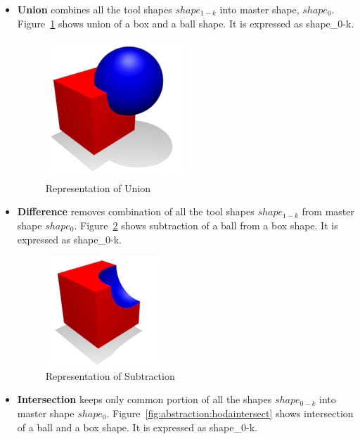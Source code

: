 \begin{itemize}[noitemsep,topsep=2pt,parsep=2pt,partopsep=2pt]
\item {\bf Union} combines all the tool shapes ${shape_{1-k}}$ into master shape, $shape_0$.  Figure~\ref{fig:abstraction:hodaunion} shows union of a box and a ball shape. It is expressed as  {shape_{0-k}}.

\begin{figure}[!h]
\centering 
\includegraphics[width=0.35\linewidth]{../Common/images/wikiunite} 
\caption{Representation of Union}
\label{fig:abstraction:hodaunion}
\end{figure}


\item {\bf Difference} removes combination of all the tool shapes ${shape_{1-k}}$ from master shape $shape_0$. Figure~\ref{fig:abstraction:hodasubtract} shows subtraction of a ball from a box shape. It is expressed as  {shape_{0-k}}.


\begin{figure}[!h]
\centering 
\includegraphics[width=0.3\linewidth]{../Common/images/wikisubtract} 
\caption{Representation of Subtraction}
\label{fig:abstraction:hodasubtract}
\end{figure}






\item {\bf Intersection} keeps only common portion of all the shapes ${shape_{0-k}}$ into master shape $shape_0$. Figure~\ref{fig:abstraction:hodaintersect} shows intersection of a ball and a box shape. It is expressed as  {shape_{0-k}}.	


\end{itemize}
